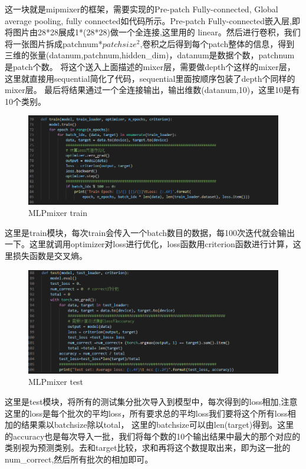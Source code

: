 \documentclass{report}
\begin{document}
    这一块就是mipmixer的框架，需要实现的Pre-patch Fully-connected, Global average pooling, fully connected如代码所示。Pre-patch Fully-connected嵌入层,即将图片由28*28展成1*(28*28)做一个全连接,这里用的
    linear。然后进行卷积，我们将一张图片拆成patchnum*$patchsize^2$,卷积之后得到每个patch整体的信息，得到三维的张量(datanum,patchnum,hidden\_dim)，datanum是数据个数，patchnum是patch个数。
    将这个送入上面描述的mixer层，需要做depth个这样的mixer层，这里就直接用sequential简化了代码，sequential里面按顺序包装了depth个同样的mixer层。
    最后将结果通过一个全连接输出，输出维数(datanum,10)，这里10是有10个类别。\par 
    \begin{figure}[H]
        \centering
        \includegraphics[width=15cm]{15.png}
        \caption{MLPmixer train}
    \end{figure}
    这里是train模块，每次train会传入一个batch数目的数据，每100次迭代就会输出一下。这里就调用optimizer对loss进行优化，loss函数用criterion函数进行计算，这里损失函数是交叉熵。\par 
    \begin{figure}[H]
        \centering
        \includegraphics[width=15cm]{16.png}
        \caption{MLPmixer test}
    \end{figure}
    这里是test模块，将所有的测试集分批次导入到模型中，每次得到的loss相加,注意这里的loss是每个批次的平均loss，所有要求总的平均loss我们要将这个所有loss相加的结果乘以batchsize除以total，
    这里的batchsize可以由len(target)得到。这里的accuracy也是每次导入一批，我们将每个数的10个输出结果中最大的那个对应的类别视为预测类别。去和target比较，求和再将这个数提取出来，即为这一批的
    num\_correct,然后所有批次的相加即可。\par 
\end{document}
